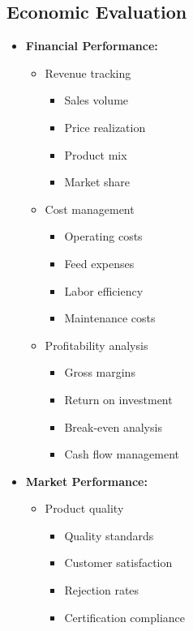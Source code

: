 \subsection{Economic Evaluation}
\begin{itemize}
    \item \textbf{Financial Performance:}
    \begin{itemize}
        \item Revenue tracking
        \begin{itemize}
            \item Sales volume
            \item Price realization
            \item Product mix
            \item Market share
        \end{itemize}
        
        \item Cost management
        \begin{itemize}
            \item Operating costs
            \item Feed expenses
            \item Labor efficiency
            \item Maintenance costs
        \end{itemize}
        
        \item Profitability analysis
        \begin{itemize}
            \item Gross margins
            \item Return on investment
            \item Break-even analysis
            \item Cash flow management
        \end{itemize}
    \end{itemize}
    
    \item \textbf{Market Performance:}
    \begin{itemize}
        \item Product quality
        \begin{itemize}
            \item Quality standards
            \item Customer satisfaction
            \item Rejection rates
            \item Certification compliance
        \end{itemize}
        

\end{itemize}
\end{itemize}
